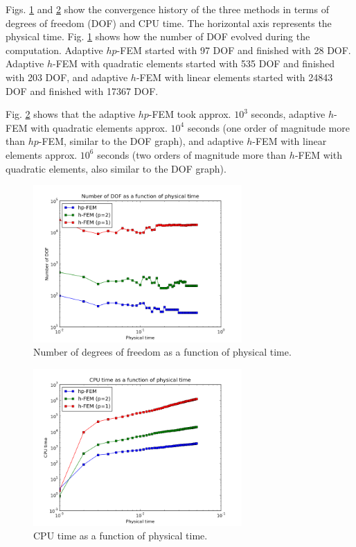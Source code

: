 \documentclass[final,3p,times,twocolumn]{elsarticle}
\begin{document}
Figs. \ref{fig:ghgh1} and \ref{fig:ghgh2} show the convergence history
of the three methods in terms of degrees of freedom (DOF) and CPU time.
The horizontal axis represents the physical time. Fig. \ref{fig:ghgh1} 
shows how the number of DOF evolved during the computation. Adaptive 
$hp$-FEM started with 97 DOF and 
finished with 28 DOF. Adaptive $h$-FEM with quadratic elements started 
with 535 DOF and finished with 203 DOF, and adaptive $h$-FEM with linear 
elements started with 24843 DOF and finished with 17367 DOF.

Fig. \ref{fig:ghgh2} shows that the adaptive 
$hp$-FEM took approx. $10^3$ seconds, adaptive $h$-FEM with quadratic 
elements approx. $10^4$ seconds (one order of magnitude more than $hp$-FEM,
similar to the DOF graph), 
and adaptive $h$-FEM with linear elements approx. $10^6$ seconds 
(two orders of magnitude more than $h$-FEM with quadratic elements,
also similar to the DOF graph).
 

\begin{figure}[!ht]
\begin{center}
\includegraphics[height=6cm]{benchmark_conv_dof.png}
\end{center}
\vspace{-6mm}
\caption{Number of degrees of freedom as a function of physical time.}
\label{fig:ghgh1}
\end{figure}


\begin{figure}[!ht]
\begin{center}
\includegraphics[height=6cm]{benchmark_conv_cpu.png}
\end{center}
\vspace{-6mm}
\caption{CPU time as a function of physical time.}
\label{fig:ghgh2}
\end{figure}
\end{document}
